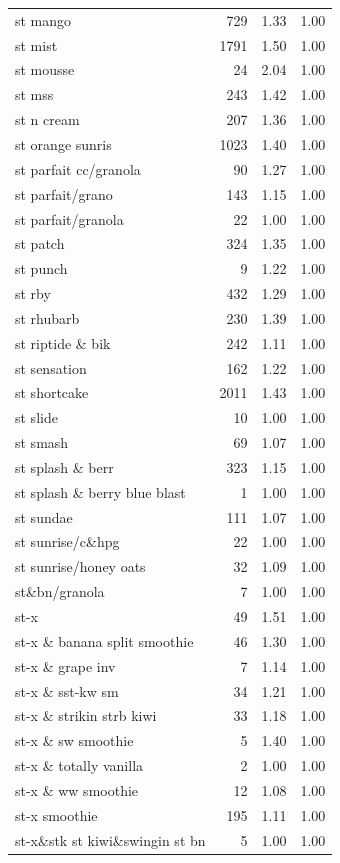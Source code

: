 \begin{table}
\begin{tabular}{lrrr}
st mango & 729 & 1.33 & 1.00 \\
st mist & 1791 & 1.50 & 1.00 \\
st mousse & 24 & 2.04 & 1.00 \\
st mss & 243 & 1.42 & 1.00 \\
st n cream & 207 & 1.36 & 1.00 \\
st orange sunris & 1023 & 1.40 & 1.00 \\
st parfait cc/granola & 90 & 1.27 & 1.00 \\
st parfait/grano & 143 & 1.15 & 1.00 \\
st parfait/granola & 22 & 1.00 & 1.00 \\
st patch & 324 & 1.35 & 1.00 \\
st punch & 9 & 1.22 & 1.00 \\
st rby & 432 & 1.29 & 1.00 \\
st rhubarb & 230 & 1.39 & 1.00 \\
st riptide \& bik & 242 & 1.11 & 1.00 \\
st sensation & 162 & 1.22 & 1.00 \\
st shortcake & 2011 & 1.43 & 1.00 \\
st slide & 10 & 1.00 & 1.00 \\
st smash & 69 & 1.07 & 1.00 \\
st splash \& berr & 323 & 1.15 & 1.00 \\
st splash \& berry blue blast & 1 & 1.00 & 1.00 \\
st sundae & 111 & 1.07 & 1.00 \\
st sunrise/c\&hpg & 22 & 1.00 & 1.00 \\
st sunrise/honey oats & 32 & 1.09 & 1.00 \\
st\&bn/granola & 7 & 1.00 & 1.00 \\
st-x & 49 & 1.51 & 1.00 \\
st-x \& banana split smoothie & 46 & 1.30 & 1.00 \\
st-x \& grape inv & 7 & 1.14 & 1.00 \\
st-x \& sst-kw sm & 34 & 1.21 & 1.00 \\
st-x \& strikin strb kiwi & 33 & 1.18 & 1.00 \\
st-x \& sw smoothie & 5 & 1.40 & 1.00 \\
st-x \& totally vanilla & 2 & 1.00 & 1.00 \\
st-x \& ww smoothie & 12 & 1.08 & 1.00 \\
st-x smoothie & 195 & 1.11 & 1.00 \\
st-x\&stk st kiwi\&swingin st bn & 5 & 1.00 & 1.00 \\

\end{tabular}
\end{table}
